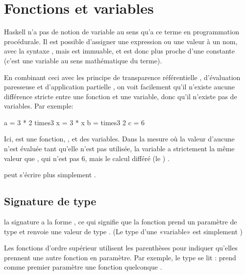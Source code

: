 \section{Fonctions et variables}
\label{functions-and-variables}

Haskell n'a pas de notion de variable au sens qu'a ce terme en programmation procédurale. Il est possible d'assigner une expression ou une valeur à un nom, avec la syntaxe , mais  est immuable, et est donc plus proche d'une constante (c'est une variable au sens mathématique du terme).

En combinant ceci avec les principe de transparence référentielle , d'évaluation paresseuse  et d'application partielle , on voit facilement qu'il n'existe aucune différence stricte entre une fonction et une variable, donc qu'il n'existe pas de variables. Par exemple:

\begin{haskellcode}
a = 3 * 2
times3 x = 3 * x
b = times3 2
c = 6
\end{haskellcode}

Ici,  est une fonction, ,  et  des variables. Dans la mesure où la valeur d'aucune n'est évaluée tant qu'elle n'est pas utilisée, la variable  a strictement la même valeur que , qui n'est pas 6, mais le calcul différé (le ) .

\begin{infobox}
 peut s'écrire plus simplement  .
\end{infobox}

\subsection{Signature de type}

la signature a la forme , ce qui signifie que la fonction prend un paramètre de type  et renvoie une valeur de type . (Le type d'une «variable» est simplement )

Les fonctions d'ordre supérieur utilisent les parenthèses pour indiquer qu'elles prennent une autre fonction en paramètre. Par exemple, le type  se lit :  prend comme premier paramètre une fonction quelconque .

